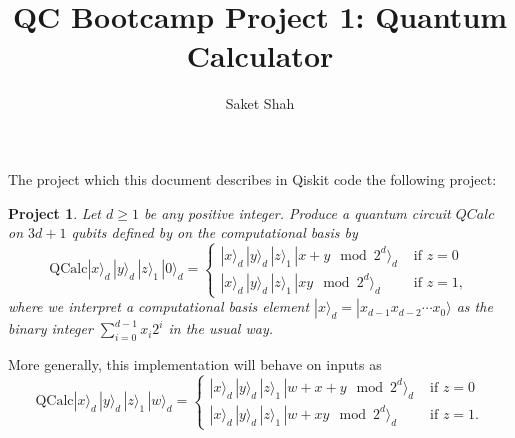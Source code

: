 \documentclass{article}
\title{QC Bootcamp Project 1: Quantum Calculator}
\author{Saket Shah}
\newtheorem{project}[theorem]{Project}
\theoremstyle{definition}
\theoremstyle{remark}
\newcommand{\braket}[1]{|#1\rangle}
\begin{document}
	\maketitle
	The project which this document describes in Qiskit code the following project: 
	\begin{project}
		Let $d \geq 1$ be any positive integer. Produce a quantum circuit $QCalc$ on $3d + 1$ qubits defined by	on the computational basis by	
		\[\mathrm{QCalc}\braket{x}_d \,\braket{y}_d \,\braket{z}_1 \,\braket{0}_d = \begin{cases}
			\braket{x}_d \,\braket{y}_d \,\braket{z}_1 \,\braket{x + y \mod 2^d}_d & \text{ if } z = 0 \\
			\braket{x}_d \,\braket{y}_d \,\braket{z}_1 \,\braket{xy \mod 2^d}_d  &\text{ if } z = 1,
		\end{cases}\]
		where we interpret a computational basis element $\braket{x}_d = \braket{x_{d-1}x_{d-2}\cdots x_0}$ as the binary integer $\sum_{i=0}^{d-1} x_i2^i$ in the usual way. 
	\end{project}
	More generally, this implementation will behave on inputs as 
	\[
		\mathrm{QCalc}\braket{x}_d \,\braket{y}_d \,\braket{z}_1 \,\braket{w}_d = \begin{cases}
		\braket{x}_d \,\braket{y}_d \,\braket{z}_1 \,\braket{w + x + y \mod 2^d}_d & \text{ if } z = 0 \\
		\braket{x}_d \,\braket{y}_d \,\braket{z}_1 \,\braket{w + xy \mod 2^d}_d  &\text{ if } z = 1.
		\end{cases}
	\]
\end{document}
